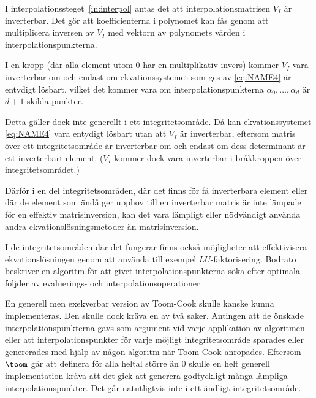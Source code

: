 I interpolationssteget~\ref{in:interpol} antas det att interpolationsmatrisen
$V_I$ är inverterbar. Det gör att koefficienterna i polynomet kan fås genom att
multiplicera inversen av $V_I$ med vektorn av polynomets värden i
interpolationspunkterna.

I en kropp (där alla element utom 0 har en multiplikativ invers) kommer $V_I$
vara inverterbar om och endast om ekvationssystemet som ges av \ref{eq:NAME4}
är entydigt lösbart, vilket det kommer vara om interpolationspunkterna
$\alpha_0, \dots, \alpha_d$ är $d + 1$ skilda punkter.

Detta gäller dock inte generellt i ett integritetsområde. Då kan
ekvationssystemet \ref{eq:NAME4} vara entydigt lösbart utan att $V_I$ är
inverterbar, eftersom matris över ett integritetsområde är inverterbar om och
endast om dess determinant är ett inverterbart
element\cite{sombatboriboon2011some}. ($V_I$ kommer dock vara inverterbar i
bråkkroppen över integritetsområdet.)

Därför i en del integritetsområden, där det finns för få inverterbara element
eller där de element som ändå ger upphov till en inverterbar matris är inte
lämpade för en effektiv matrisinversion, kan det vara lämpligt eller nödvändigt
använda andra ekvationslösningsmetoder än matrisinversion.


I de integritetsområden där det fungerar finns också möjligheter att
effektivisera ekvationslösningen genom att använda till exempel
$LU$-faktorisering. Bodrato\cite{bodrato2007towards}\cite{bodrato2007integer}
beskriver en algoritm för att givet interpolationspunkterna söka efter optimala
följder av evaluerings- och interpolationsoperationer.

En generell men exekverbar version av Toom-Cook skulle kanske kunna
implementeras. Den skulle dock kräva en av två saker. Antingen att de önskade
interpolationspunkterna gavs som argument vid varje applikation av algoritmen
eller att interpolationspunkter för varje möjligt integritetsområde sparades
eller genererades med hjälp av någon algoritm när Toom-Cook anropades. Eftersom
$\toom$ går att definera för alla heltal större än 0 skulle en helt generell
implementation kräva att det gick att generera godtyckligt många lämpliga
interpolationspunkter. Det går natutligtvis inte i ett ändligt
integritetsområde.

